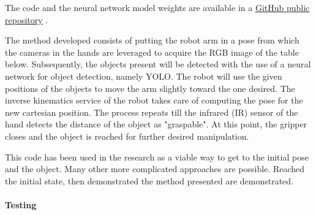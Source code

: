 The code and the neural network model weights are available in a \href{https://github.com/igor-lirussi/Baxter-Robot-ObjDet}{GitHub public repository} \cite{url:BaxterrepoObjDet}.

The method developed consists of putting the robot arm in a pose from which the cameras in the hands are leveraged to acquire the RGB image of the table below. Subsequently, the objects present will be detected with the use of a neural network for object detection, namely YOLO. The robot will use the given positions of the objects to move the arm slightly toward the one desired. The inverse kinematics service of the robot takes care of computing the pose for the new cartesian position. The process repeats till the infrared (IR) sensor of the hand detects the distance of the object as "graspable". At this point, the gripper closes and the object is reached for further desired manipulation.

This code has been used in the research as a viable way to get to the initial pose and the object. Many other more complicated approaches are possible. Reached the initial state, then demonstrated the method presented are demonstrated.   



\paragraph{Testing}